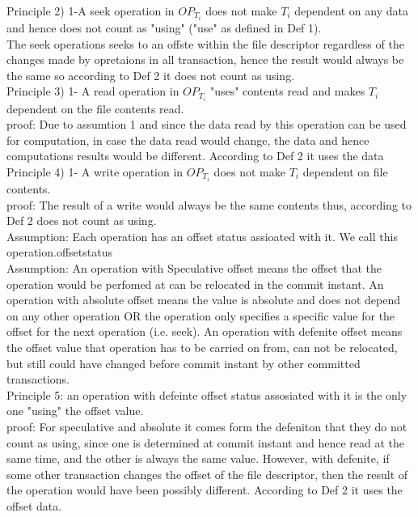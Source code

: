 \documentclass[a4paper, 11pt]{article}
\begin{document}
Principle 2) 1-A seek operation in $OP_{T_i}$ does not make $T_i$ dependent on any data and hence does not count as "using" ("use" as defined in Def 1).\\

The seek operations seeks to an offste within the file descriptor regardless of the changes made by opretaions in all transaction, hence the result would always be the same so according to Def 2 it does not count as using.\\ 

Principle 3) 1- A read operation in $OP_{T_i}$ "uses" contents read and makes $T_i$ dependent on the file contents read.\\

proof: Due to assumtion 1 and since the data read by this operation can be used for computation, in case the data read would change, the data and hence computations results would be different. According to Def 2 it uses the data\\

Principle 4) 1- A write operation in $OP_{T_i}$ does not make $T_i$ dependent on file contents.\\   

proof: The result of a write would always be the same contents thus, according to Def 2 does not count as using.\\

Assumption: Each operation has an offset status assioated with it. We call this operation.offsetstatus\\

Assumption: An operation with Speculative offset means the offset that the operation would be perfomed at can be relocated in the commit instant. An operation with absolute offset means the value is absolute and does not depend on any other operation OR the operation only specifies a specific value for the offset for the next operation (i.e. seek). An operation with defenite offset means the offset value that operation has to be carried on from, can not be relocated, but still could have changed before commit instant by other committed transactions. \\

Principle 5: an operation with defeinte offset status assosiated with it is the only one "using" the offset value.\\

proof: For speculative and absolute it comes form the defeniton that they do not count as using, since one is determined at commit instant and hence read at the same time, and the other is always the same value. However, with defenite, if some other transaction changes the offset of the file descriptor, then the result of the operation would have been possibly different. According to Def 2 it uses the offset data.\\ 
\end{document}
